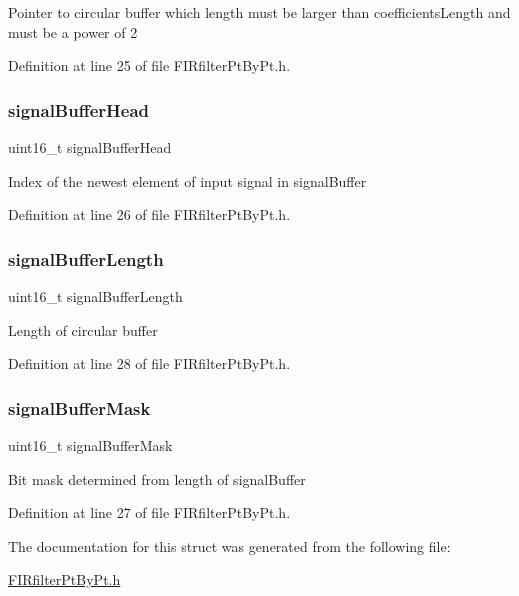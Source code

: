 Pointer to circular buffer which length must be larger than coefficients\+Length and must be a power of 2 

Definition at line 25 of file F\+I\+Rfilter\+Pt\+By\+Pt.\+h.

\mbox{\label{struct_f_i_rfilter_object_af41fd03c2023df9d8b4ce391377ef584_af41fd03c2023df9d8b4ce391377ef584}} 
\subsubsection{\texorpdfstring{signalBufferHead}{signalBufferHead}}
{\footnotesize\ttfamily uint16\+\_\+t signal\+Buffer\+Head}

Index of the newest element of input signal in signal\+Buffer 

Definition at line 26 of file F\+I\+Rfilter\+Pt\+By\+Pt.\+h.

\mbox{\label{struct_f_i_rfilter_object_ae88c8be8c92f567c52541641d6cad892_ae88c8be8c92f567c52541641d6cad892}} 
\subsubsection{\texorpdfstring{signalBufferLength}{signalBufferLength}}
{\footnotesize\ttfamily uint16\+\_\+t signal\+Buffer\+Length}

Length of circular buffer 

Definition at line 28 of file F\+I\+Rfilter\+Pt\+By\+Pt.\+h.

\mbox{\label{struct_f_i_rfilter_object_a3c833068892d3855a15079c572c1936c_a3c833068892d3855a15079c572c1936c}} 
\subsubsection{\texorpdfstring{signalBufferMask}{signalBufferMask}}
{\footnotesize\ttfamily uint16\+\_\+t signal\+Buffer\+Mask}

Bit mask determined from length of signal\+Buffer 

Definition at line 27 of file F\+I\+Rfilter\+Pt\+By\+Pt.\+h.



The documentation for this struct was generated from the following file\+:\begin{DoxyCompactItemize}
\item 
\mbox{\hyperlink{_f_i_rfilter_pt_by_pt_8h}{F\+I\+Rfilter\+Pt\+By\+Pt.\+h}}\end{DoxyCompactItemize}
